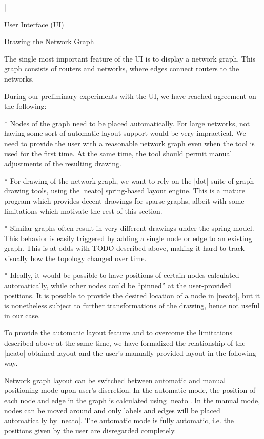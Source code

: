 
\typosize[14/18]
\activettchar|

\sec User Interface (UI)

\secc Drawing the Network Graph

The single most important feature of the UI is to display a network graph. This
graph consists of routers and networks, where edges connect routers to the
networks.

During our preliminary experiments with the UI, we have reached agreement on the
following:

\begitems

* Nodes of the graph need to be placed automatically. For large networks, not
having some sort of automatic layout support would be very impractical. We need
to provide the user with a reasonable network graph even when the tool is used
for the first time. At the same time, the tool should permit manual adjustments
of the resulting drawing.

* For drawing of the network graph, we want to rely on the |dot| suite of graph
drawing tools, using the |neato| spring-based layout engine. This is a mature
program which provides decent drawings for sparse graphs, albeit with some
limitations which motivate the rest of this section.

* Similar graphs often result in very different drawings under the spring
model. This behavior is easily triggered by adding a single node or edge to an
existing graph. This is at odds with TODO described above, making it hard to
track visually how the topology changed over time.

* Ideally, it would be possible to have positions of certain nodes calculated
automatically, while other nodes could be ``pinned'' at the user-provided
positions. It is possible to provide the desired location of a node in |neato|,
but it is nonetheless subject to further transformations of the drawing, hence
not useful in our case.

\enditems

To provide the automatic layout feature and to overcome the limitations
described above at the same time, we have formalized the relationship of the
|neato|-obtained layout and the user's manually provided layout in the following
way.

Network graph layout can be switched between automatic and manual positioning
mode upon user's discretion. In the automatic mode, the position of each node
and edge in the graph is calculated using |neato|. In the manual mode, nodes
can be moved around and only labels and edges will be placed automatically by
|neato|. The automatic mode is fully automatic, i.e. the positions given by the
user are disregarded completely.


